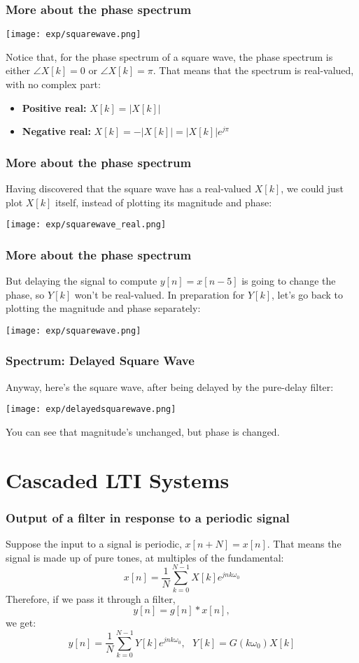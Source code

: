 \documentclass{beamer}
\begin{document}
\begin{frame}
  \frametitle{More about the phase spectrum}
  \centerline{\texttt{[image: exp/squarewave.png]}}
  Notice that, for the phase spectrum of a square wave, the phase
  spectrum is either $\angle X[k]=0$ or $\angle X[k]=\pi$.  That means that the
  spectrum is real-valued, with no complex part:
  \begin{itemize}
  \item {\bf Positive real:} $X[k]=|X[k]|$
  \item {\bf Negative real:} $X[k]=-|X[k]| = |X[k]|e^{j\pi}$
  \end{itemize}
\end{frame}

\begin{frame}
  \frametitle{More about the phase spectrum}
  
  Having discovered that the square wave has a real-valued $X[k]$, we could
  just plot $X[k]$ itself, instead of plotting its magnitude and phase:
  \centerline{\texttt{[image: exp/squarewave\_real.png]}}
\end{frame}

\begin{frame}
  \frametitle{More about the phase spectrum}

  But delaying the signal to compute $y[n]=x[n-5]$ is going to change
  the phase, so $Y[k]$ won't be real-valued.  In preparation for
  $Y[k]$, let's go back to plotting the magnitude and phase
  separately:
  \centerline{\texttt{[image: exp/squarewave.png]}}
\end{frame}

\begin{frame}
  \frametitle{Spectrum: Delayed Square Wave}
  Anyway, here's the square wave, after being delayed by the pure-delay filter:
  \centerline{\texttt{[image: exp/delayedsquarewave.png]}}
  You can see that magnitude's unchanged, but phase is changed.
\end{frame}

\section[Cascades]{Cascaded LTI Systems}
\setcounter{subsection}{1}

\begin{frame}
  \frametitle{Output of a filter in response to a periodic signal}

  Suppose the input to a signal is periodic, $x[n+N]=x[n]$.  That
  means the signal is made up of pure tones, at multiples of the
  fundamental:
  \[
  x[n] = \frac{1}{N}\sum_{k=0}^{N-1} X[k] e^{jnk\omega_0}
  \]
  Therefore, if we pass it through a filter,
  \[
  y[n]=g[n]\ast x[n],
  \]
  we get:
  \[
  y[n]=\frac{1}{N}\sum_{k=0}^{N-1} Y[k] e^{jnk\omega_0},~~~Y[k]=G(k\omega_0)X[k]
  \]
\end{frame}
\end{document}
